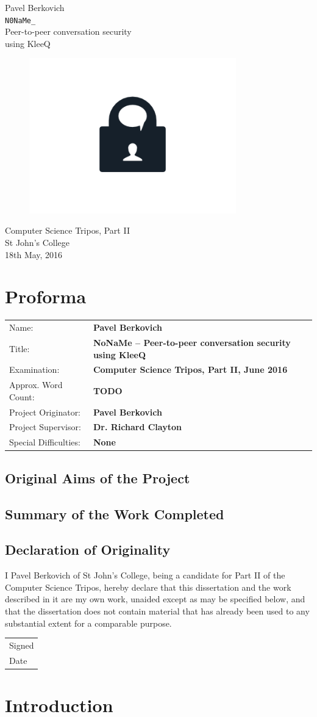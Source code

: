 \documentclass[a4paper, 12pt]{report}
\newcommand{\skippage}{\newpage\null\newpage}
\newcommand*{\titleTH}{ %
\begingroup
\raggedleft
\thispagestyle{empty}
{\Large Pavel Berkovich}\\[0.167\textheight] \centering
{\huge \texttt{N0NaMe\_}}\\[\baselineskip]
{\Large Peer-to-peer conversation security \\ using KleeQ} \\
\begin{figure}[h]
    \centering
    \includegraphics[width = 0.8\textwidth]{lock_chat.png} 
\end{figure}
{\large Computer Science Tripos, Part II}\\ \vspace{3mm}
{\large St John's College} \\ \vspace{3mm}
{\large 18th May, 2016}
\vfill
\clearpage
\endgroup}
\begin{document}
\titleTH


\chapter*{Proforma}
\begin{tabular}{l >{\bfseries}l}
    Name: & Pavel Berkovich \\
    Title: & NoNaMe -- Peer-to-peer conversation security using KleeQ \\
    Examination: & Computer Science Tripos, Part II, June 2016 \\
    Approx. Word Count: & {\color{red} TODO} \\
    Project Originator: & Pavel Berkovich \\
    Project Supervisor: & Dr. Richard Clayton \\
    Special Difficulties: & None
\end{tabular}

\section*{Original Aims of the Project}

\section*{Summary of the Work Completed}

\pagebreak
\section*{Declaration of Originality}
I Pavel Berkovich of St John's College, being a candidate for Part II of the Computer Science Tripos, hereby declare that this dissertation and the work described in it are my own work, unaided except as may be specified below, and that the dissertation does not contain material that has already been used to any substantial extent for a comparable purpose. \\[0.8cm]
\begin{tabular}{l}
    Signed \\[0.8cm]
    Date
\end{tabular}
\vfill

\tableofcontents

\skippage



\chapter{Introduction}
\end{document}
